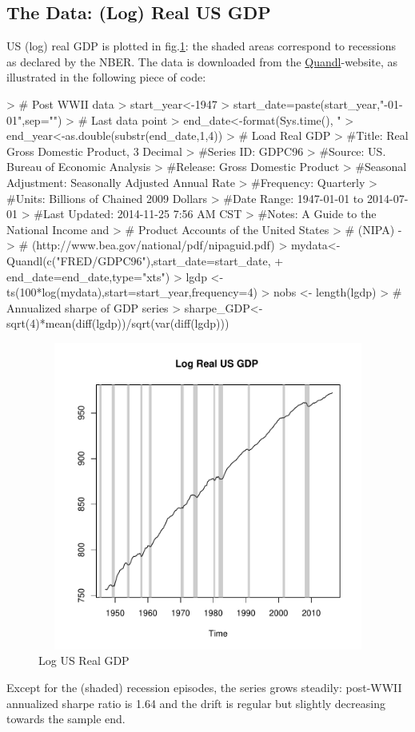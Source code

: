 \documentclass[a4paper]{book}
\begin{document}
\subsection{The Data: (Log) Real US GDP}

US (log) real GDP is plotted in fig.\ref{z_us_real_log_gdp}: the shaded areas correspond to recessions as declared by the NBER. The data is downloaded from the \href{https://www.quandl.com}{Quandl}-website, as illustrated in the following piece of code:
\begin{Schunk}
\begin{Sinput}
> # Post WWII data
> start_year<-1947 
> start_date=paste(start_year,"-01-01",sep="")
> # Last data point
> end_date<-format(Sys.time(), "%
> end_year<-as.double(substr(end_date,1,4))
> # Load Real GDP
> #Title:               Real Gross Domestic Product, 3 Decimal
> #Series ID:           GDPC96
> #Source:              US. Bureau of Economic Analysis
> #Release:             Gross Domestic Product
> #Seasonal Adjustment: Seasonally Adjusted Annual Rate
> #Frequency:           Quarterly
> #Units:               Billions of Chained 2009 Dollars
> #Date Range:          1947-01-01 to 2014-07-01
> #Last Updated:        2014-11-25 7:56 AM CST
> #Notes:               A Guide to the National Income and 
> #                     Product Accounts of the United States 
> #                     (NIPA) - 
> #   (http://www.bea.gov/national/pdf/nipaguid.pdf)
> mydata<-Quandl(c("FRED/GDPC96"),start_date=start_date,
+                end_date=end_date,type="xts")
> lgdp <- ts(100*log(mydata),start=start_year,frequency=4)
> nobs <- length(lgdp)
> # Annualized sharpe of GDP series
> sharpe_GDP<-sqrt(4)*mean(diff(lgdp))/sqrt(var(diff(lgdp)))
\end{Sinput}
\end{Schunk}
\begin{figure}[H]\begin{center}\includegraphics[height=4in, width=6in]{z_us_real_log_gdp}\caption{Log US Real GDP\label{z_us_real_log_gdp}}\end{center}\end{figure}Except for the (shaded) recession episodes, the series grows steadily: post-WWII annualized sharpe ratio is 1.64 and the drift is  regular but slightly decreasing towards the sample end. 
\end{document}
